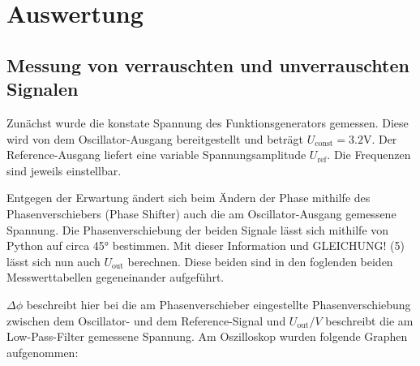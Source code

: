 \section{Auswertung}
\subsection{Messung von verrauschten und unverrauschten Signalen}
\label{sec:Auswertung}

Zunächst wurde die konstate Spannung des Funktionsgenerators gemessen. Diese wird von dem Oscillator-Ausgang bereitgestellt und beträgt $U_\text{const} = 3.2$V\!. Der Reference-Ausgang liefert eine variable Spannungsamplitude $U_\text{ref}$.
Die Frequenzen sind jeweils einstellbar.

Entgegen der Erwartung ändert sich beim Ändern der Phase mithilfe des Phasenverschiebers (Phase Shifter) auch die am Oscillator-Ausgang gemessene Spannung.
Die Phasenverschiebung der beiden Signale lässt sich mithilfe von Python auf circa 45° bestimmen. Mit dieser Information und GLEICHUNG! (5) lässt sich nun auch $U_\text{out}$ berechnen.
Diese beiden sind in den foglenden beiden Messwerttabellen gegeneinander aufgeführt.


$\Delta\phi$ beschreibt hier bei die am Phasenverschieber eingestellte Phasenverschiebung zwischen dem Oscillator- und dem Reference-Signal und $U_\text{out} / V$ beschreibt die am
Low-Pass-Filter gemessene Spannung. Am Oszilloskop wurden folgende Graphen aufgenommen:

